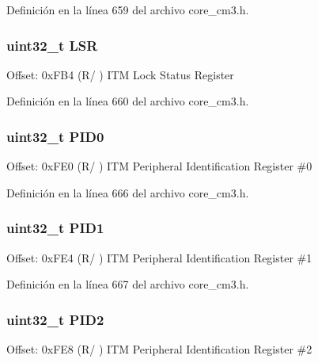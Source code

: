Definición en la línea 659 del archivo core\+\_\+cm3.\+h.

\subsubsection[{\texorpdfstring{L\+SR}{LSR}}]{ uint32\+\_\+t L\+SR}\hypertarget{struct_i_t_m___type_a8387dc0dc9f45c8a81cfc98bfff7ae32}{}\label{struct_i_t_m___type_a8387dc0dc9f45c8a81cfc98bfff7ae32}
Offset\+: 0x\+F\+B4 (R/ ) I\+TM Lock Status Register 

Definición en la línea 660 del archivo core\+\_\+cm3.\+h.

\subsubsection[{\texorpdfstring{P\+I\+D0}{PID0}}]{ uint32\+\_\+t P\+I\+D0}\hypertarget{struct_i_t_m___type_ad6c87ae4ca1aa56b4369a97fca639926}{}\label{struct_i_t_m___type_ad6c87ae4ca1aa56b4369a97fca639926}
Offset\+: 0x\+F\+E0 (R/ ) I\+TM Peripheral Identification Register \#0 

Definición en la línea 666 del archivo core\+\_\+cm3.\+h.

\subsubsection[{\texorpdfstring{P\+I\+D1}{PID1}}]{ uint32\+\_\+t P\+I\+D1}\hypertarget{struct_i_t_m___type_ae554433b6f6c4733d222bcb2c75ccb39}{}\label{struct_i_t_m___type_ae554433b6f6c4733d222bcb2c75ccb39}
Offset\+: 0x\+F\+E4 (R/ ) I\+TM Peripheral Identification Register \#1 

Definición en la línea 667 del archivo core\+\_\+cm3.\+h.

\subsubsection[{\texorpdfstring{P\+I\+D2}{PID2}}]{ uint32\+\_\+t P\+I\+D2}\hypertarget{struct_i_t_m___type_af07d9a44e0188d55742f5d6a8752cd2c}{}\label{struct_i_t_m___type_af07d9a44e0188d55742f5d6a8752cd2c}
Offset\+: 0x\+F\+E8 (R/ ) I\+TM Peripheral Identification Register \#2 

